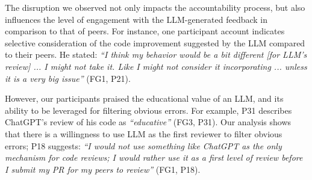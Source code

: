 The disruption we observed not only impacts the accountability process, but also influences the level of engagement with the LLM-generated feedback in comparison to that of peers. For instance, one participant account indicates selective consideration of the code improvement suggested by the LLM compared to their peers. He stated: \emph{``I think my behavior would be a bit different [for LLM's review] ... I might not take it. Like I might not consider it incorporating ... unless it is a very big issue''} (FG1, P21).

However, our participants praised the educational value of an LLM, and its ability to be leveraged for filtering obvious errors. For example, P31 describes ChatGPT's review of his code as \emph{``educative''} (FG3, P31). Our analysis shows that there is a willingness to use LLM as the first reviewer to filter obvious errors; P18 suggests: \emph{``I would not use something like ChatGPT as the only mechanism for code reviews; I would rather use it as a first level of review before I submit my PR for my peers to review''} (FG1, P18).


